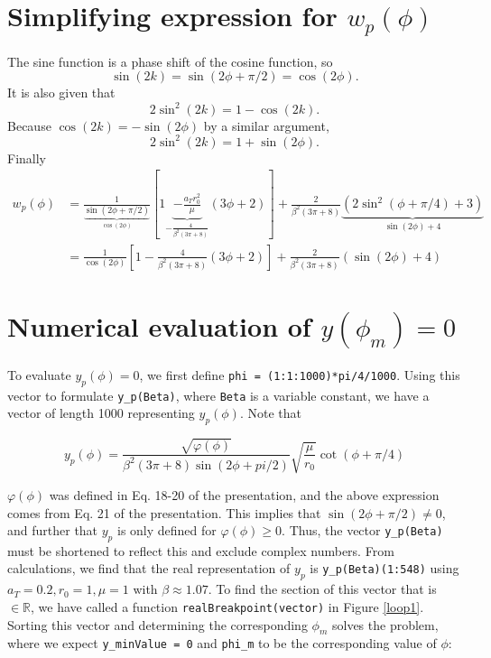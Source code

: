 \section{Simplifying expression for \texorpdfstring{$w_p(\phi)$}{}}

The sine function is a phase shift of the cosine function, so 
\begin{equation}
    \sin(2k)=\sin(2\phi+\pi/2)=\cos(2\phi).
\end{equation}
It is also given that
\begin{equation}
    2\sin^2(2k)=1-\cos(2k).
\end{equation}
Because $\cos(2k)=-\sin(2\phi)$ by a similar argument, 
\begin{equation}
    2\sin^2(2k)=1+\sin(2\phi).
\end{equation}
Finally
\begin{align}
    w_p(\phi)&=\frac{1}{\underbrace{\sin(2\phi+\pi/2)}_{\cos(2\phi)}}[1\underbrace{-\frac{a_Tr_0^2}{\mu}}_{-\frac{4}{\beta^2(3\pi+8)}}(3\phi+2)]+\frac{2}{\beta^2(3\pi+8)}\underbrace{(2\sin^2(\phi+\pi/4)+3)}_{\sin(2\phi)+4}\\
    &=\frac{1}{\cos(2\phi)}\left[1-\frac{4}{\beta^2(3\pi+8)}(3\phi+2)\right]+\frac{2}{\beta^2(3\pi+8)}(\sin(2\phi)+4)
\end{align}

\section{Numerical evaluation of \texorpdfstring{$y(\phi_m)=0$}{}}

To evaluate $y_p(\phi)=0$, we first define \verb|phi = (1:1:1000)*pi/4/1000|. 
Using this vector to formulate \verb|y_p(Beta)|, where \verb|Beta| is a variable constant, we have a vector of length 1000 representing $y_p(\phi)$.
Note that

\begin{equation}
    y_p(\phi)=\frac{\sqrt{\varphi(\phi)}}{\beta^2(3\pi+8)\sin(2\phi+pi/2)}\sqrt{\frac{\mu}{r_0}}\cot(\phi+\pi/4)
\end{equation}

$\varphi(\phi)$ was defined in Eq. 18-20 of the presentation, and the above expression comes from Eq. 21 of the presentation. This implies that $\sin(2\phi+\pi/2)\neq 0$, and further that $y_p$ is only defined for $\varphi(\phi)\geq 0$. Thus, the vector \verb|y_p(Beta)| must be shortened to reflect this and exclude complex numbers.
From calculations, we find that the real representation of $y_p$ is \verb|y_p(Beta)(1:548)| using $a_T=0.2,r_0=1,\mu=1$ with $\beta\approx 1.07$.
To find the section of this vector that is $\in \mathbb{R}$, we have called a function \verb|realBreakpoint(vector)| in Figure \ref{loop1}.
Sorting this vector and determining the corresponding $\phi_m$ solves the problem, where we expect \verb|y_minValue = 0| and \verb|phi_m| to be the corresponding value of $\phi$:


